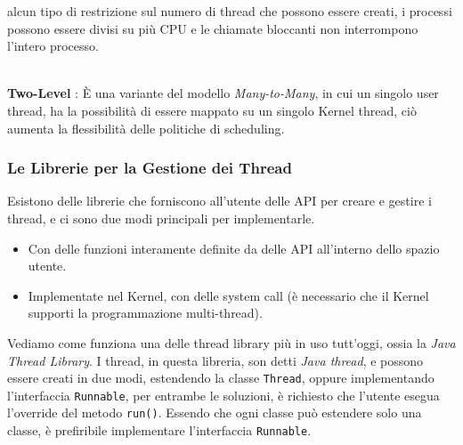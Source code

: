\documentclass[12pt, letterpaper]{article}
\newcommand{\code}[1]{\colorbox{light-gray}{\texttt{#1}}}
\begin{document}
alcun tipo di restrizione sul numero di thread che possono essere creati, i processi possono essere divisi 
su più CPU e le chiamate bloccanti non interrompono l'intero processo.\begin{figure}[h]
\end{figure}
\\\textbf{Two-Level} : È una variante del modello \textit{Many-to-Many}, in cui un singolo user thread, ha la 
possibilità di essere mappato su un singolo Kernel thread, ciò aumenta la flessibilità delle politiche di scheduling.\begin{figure}[h]
\end{figure}
\subsubsection{Le Librerie per la Gestione dei Thread}
Esistono delle librerie che forniscono all'utente delle API per creare e gestire i thread, e ci sono due 
 modi principali per implementarle.\begin{itemize}
    \item Con delle funzioni interamente definite da delle API all'interno dello 
    spazio utente.
    \item Implementate nel Kernel, con delle system call (è necessario 
    che il Kernel supporti la programmazione multi-thread).
 \end{itemize}
 Vediamo come funziona una delle thread library più in uso tutt'oggi, 
 ossia la \textit{Java Thread Library}. I thread, in questa libreria, son 
 detti \textit{Java thread}, e possono essere creati in due modi, estendendo 
 la classe \code{Thread}, oppure implementando l'interfaccia 
 \code{Runnable}, per entrambe le soluzioni, è richiesto che l'utente 
 esegua l'override del metodo \code{run()}. Essendo che ogni classe 
 può estendere solo una classe, è prefiribile implementare l'interfaccia 
 \code{Runnable}.
\end{document}
